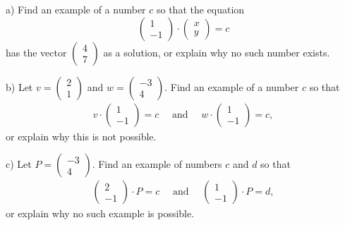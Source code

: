 \documentclass[elementsmain.tex]{subfiles}
\begin{document}
\begin{exercise}
\begin{compactitem}
\item[a)] Find an example of a number $c$ so that the equation
\[
\begin{pmatrix} 1 \\ -1 \end{pmatrix} \cdot \begin{pmatrix} x \\ y \end{pmatrix} = c
\]
has the vector $\left(\begin{smallmatrix}4 \\ 7 \end{smallmatrix}\right)$ as a solution, or explain why no such number exists.
\item[b)] Let $v = \left(\begin{smallmatrix}2\\1\end{smallmatrix}\right)$ and $w=\left(\begin{smallmatrix}-3\\4\end{smallmatrix}\right)$. Find an example of a number $c$ so that 
\begin{gather*} 
v \cdot \begin{pmatrix}1\\-1\end{pmatrix} = c \quad\text{ and } \quad w \cdot \begin{pmatrix}1\\-1\end{pmatrix} = c, 
\end{gather*}
or explain why this is not possible.
\item[c)] Let $P = \left(\begin{smallmatrix}-3\\4\end{smallmatrix}\right)$. Find an example of numbers $c$ and $d$ so that 
\begin{gather*} \begin{pmatrix} 2\\-1\end{pmatrix}\cdot P = c \quad\text{ and } \quad \begin{pmatrix} 1\\-1\end{pmatrix}\cdot P = d, 
\end{gather*} 
or explain why no such example is possible.
\end{compactitem}
\end{exercise}
\end{document}
